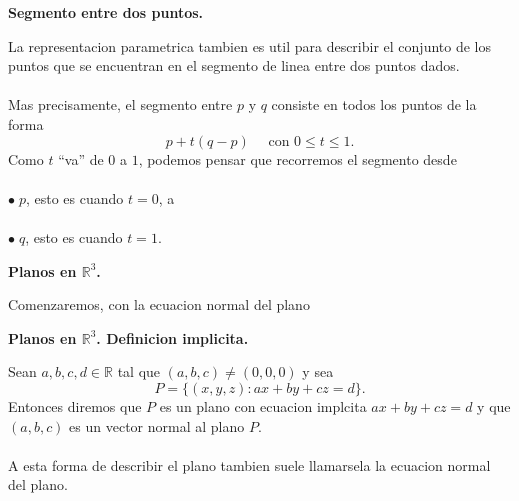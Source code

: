\documentclass{article}
\theoremstyle{definition}
\theoremstyle{definition}
\theoremstyle{remark}
\newcommand\bl{$\bullet\;$}
\begin{document}
\begin{center}
\textbf{Segmento entre dos puntos.}
\end{center}
La representacion parametrica tambien es util para describir el conjunto de los puntos que se encuentran en el segmento de linea entre dos puntos dados.\\\\
Mas precisamente, el segmento entre $p$ y $q$ consiste en todos los puntos de la forma \[
  p+t(q-p) \quad \text{ con } 0\leq t \leq 1.
\]
Como $t$ ``va'' de $0$ a $1$, podemos pensar que recorremos el segmento desde \\\\
\bl $p$, esto es cuando $t=0$, a \\\\
\bl $q$, esto es cuando $t=1$.
\begin{center}
  \textbf{Planos en $\mathbb{R}^3$.}
\end{center}
Comenzaremos, con la ecuacion normal del plano 
\begin{figure}[h]
\centering
\def\svgwidth{0.65\textwidth}

\end{figure}
\pagebreak

\begin{center}
  \textbf{Planos en $\mathbb{R}^3$. Definicion implicita.} 
\end{center}
\begin{defi}
  Sean $a,b,c,d \in \mathbb{R}$ tal que $(a,b,c) \neq (0,0,0)$ y sea \[
    P=\big\{(x,y,z) : ax+by+cz=d\big\}.
  \]
Entonces diremos que $P$ es un plano con ecuacion implcita $ax+by+cz=d$ y que $(a,b,c)$ es un vector normal al plano $P$.\\\\
A esta forma de describir el plano tambien suele llamarsela la ecuacion normal del plano.\\\\
\end{defi}
\end{document}
